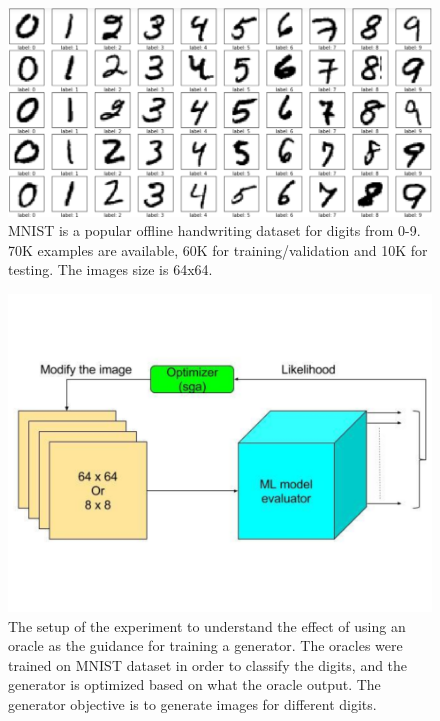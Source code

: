   \begin{figure}
    \centering
    \includegraphics[scale=0.4]{images/adv_attack/mnist.png}
    \caption{MNIST is a popular offline handwriting dataset for digits from 0-9. 70K examples are available, 60K for training/validation and 10K for testing. The images size is 64x64.}
    \label{fig:mnist}
  \end{figure}

  \begin{figure}
    \centering
    \includegraphics[scale=0.4]{images/adv_attack/adversarial_optimization.png}
    \caption{The setup of the experiment to understand the effect of using an oracle as the guidance for training a generator. The oracles were trained on MNIST dataset in order to classify the digits, and the generator is optimized based on what the oracle output. The generator objective is to generate images for different digits.}
    \label{fig:adversarial_exp_setup}
  \end{figure}

